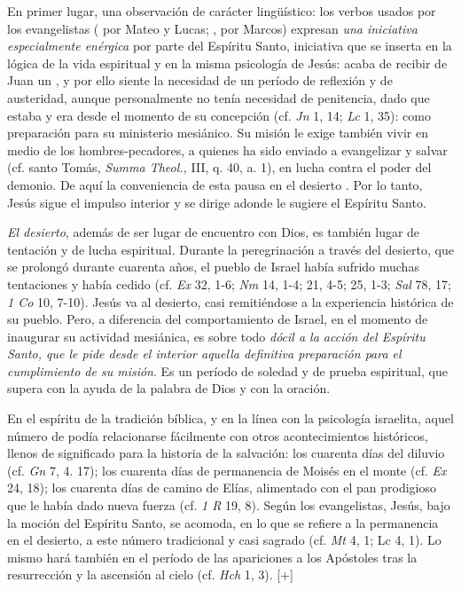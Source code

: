 \begin{patercite}En primer lugar, una observación de carácter lingüístico: los verbos usados por los evangelistas ( por Mateo y Lucas; , por Marcos) expresan \textit{una iniciativa especialmente enérgica} por parte del Espíritu Santo, iniciativa que se inserta en la lógica de la vida espiritual y en la misma psicología de Jesús: acaba de recibir de Juan un , y por ello siente la necesidad de un período de reflexión y de austeridad, aunque personalmente no tenía necesidad de penitencia, dado que estaba  y era  desde el momento de su concepción (cf. \textit{Jn} 1, 14; \textit{Lc} 1, 35): como preparación para su ministerio mesiánico. Su misión le exige también vivir en medio de los hombres-pecadores, a quienes ha sido enviado a evangelizar y salvar (cf. santo Tomás, \textit{Summa Theol.,} III, q. 40, a. 1), en lucha contra el poder del demonio. De aquí la conveniencia de esta pausa en el desierto . Por lo tanto, Jesús sigue el impulso interior y se dirige adonde le sugiere el Espíritu Santo.\end{patercite}

\begin{patercite}\textit{El desierto}, además de ser lugar de encuentro con Dios, es también lugar de tentación y de lucha espiritual. Durante la peregrinación a través del desierto, que se prolongó durante cuarenta años, el pueblo de Israel había sufrido muchas tentaciones y había cedido (cf. \textit{Ex} 32, 1-6; \textit{Nm} 14, 1-4; 21, 4-5; 25, 1-3; \textit{Sal} 78, 17; \textit{1 Co} 10, 7-10). Jesús va al desierto, casi remitiéndose a la experiencia histórica de su pueblo. Pero, a diferencia del comportamiento de Israel, en el momento de inaugurar su actividad mesiánica, es sobre todo \textit{dócil a la acción del Espíritu Santo, que le pide desde el interior aquella definitiva preparación para el cumplimiento de su misión}. Es un período de soledad y de prueba espiritual, que supera con la ayuda de la palabra de Dios y con la oración. \end{patercite}

\begin{patercite}En el espíritu de la tradición bíblica, y en la línea con la psicología israelita, aquel número de  podía relacionarse fácilmente con otros acontecimientos históricos, llenos de significado para la historia de la salvación: los cuarenta días del diluvio (cf. \textit{Gn} 7, 4. 17); los cuarenta días de permanencia de Moisés en el monte (cf. \textit{Ex} 24, 18); los cuarenta días de camino de Elías, alimentado con el pan prodigioso que le había dado nueva fuerza (cf. \textit{1 R} 19, 8). Según los evangelistas, Jesús, bajo la moción del Espíritu Santo, se acomoda, en lo que se refiere a la permanencia en el desierto, a este número tradicional y casi sagrado (cf. \textit{Mt} 4, 1; Lc 4, 1). Lo mismo hará también en el período de las apariciones a los Apóstoles tras la resurrección y la ascensión al cielo (cf. \textit{Hch} 1, 3). [+]\end{patercite}


